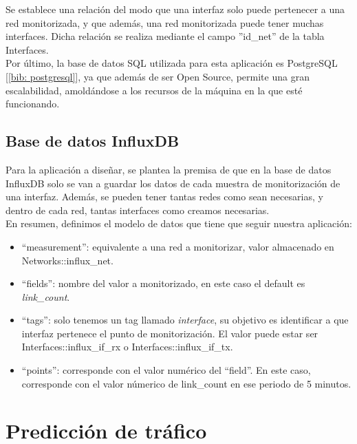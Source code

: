 \documentclass[a4paper, oneside, 12pt]{book}
\begin{document}
	\noindent Se establece una relación del modo que una interfaz solo puede pertenecer a una red monitorizada, y que además, una red monitorizada puede tener muchas interfaces. Dicha relación se realiza mediante el campo ''id\_net'' de la tabla Interfaces. \\
	
	\noindent Por último, la base de datos SQL utilizada para esta aplicación es PostgreSQL [\ref{bib: postgresql}], ya que además de ser Open Source, permite una gran escalabilidad, amoldándose a los recursos de la máquina en la que esté funcionando.
	
	\subsection{Base de datos InfluxDB}
	
	
	\noindent Para la aplicación a diseñar, se plantea la premisa de que en la base de datos InfluxDB solo se van a guardar los datos de cada muestra de monitorización de una interfaz. Además, se pueden tener tantas redes como sean necesarias, y dentro de cada red, tantas interfaces como creamos necesarias. \\
	
	\noindent En resumen, definimos el modelo de datos que tiene que seguir nuestra aplicación:
	
	\begin{itemize}
		\item ``measurement'': equivalente a una red a monitorizar, valor almacenado en Networks::influx\_net.
		\item ``fields'': nombre del valor a monitorizado, en este caso el default es \textit{link\_count}.
		\item ``tags'': solo tenemos un tag llamado \textit{interface}, su objetivo es identificar a que interfaz pertenece el punto de monitorización. El valor puede estar ser Interfaces::influx\_if\_rx o Interfaces::influx\_if\_tx.
		\item ``points'': corresponde con el valor numérico del ``field''. En este caso, corresponde con el valor númerico de link\_count en ese periodo de 5 minutos.
	\end{itemize}

	\section{Predicción de tráfico}
	
\end{document}
